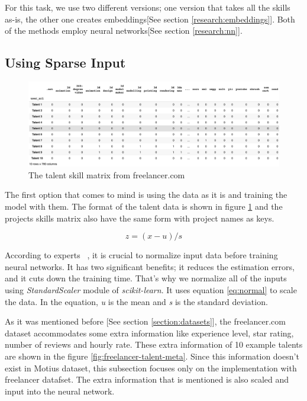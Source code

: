 For this task, we use two different versions; one version that takes all the skills as-is, the other one creates embeddings[See section \ref{research:embeddings}]. Both of the methods employ neural networks[See section \ref{research:nn}].


\subsection{Using Sparse Input}

\begin{figure}[htp]
	\centering
	\includegraphics[width=\textwidth]{figures/FreelancerTalentSkillsMatrix.png}
	\caption{The talent skill matrix from freelancer.com}
	\label{fig:freelancer-talent-matrix}
\end{figure}

The first option that comes to mind is using the data as it is and training the model with them. The format of the talent data is shown in figure \ref{fig:freelancer-talent-matrix} and the projects skills matrix also have the same form with project names as keys.


\begin{equation}
z = (x - u) / s
\label{eq:normal}
\end{equation}

According to experts ~\parencite{sola1997importance}, it is crucial to normalize input data before training neural networks. It has two significant benefits; it reduces the estimation errors, and it cuts down the training time. That's why we normalize all of the inputs using \textit{StandardScaler} module of \textit{scikit-learn}. It uses equation \ref{eq:normal} to scale the data. In the equation, \textit{u} is the mean and \textit{s} is the standard deviation.


As it was mentioned before [See section \ref{section:datasets}], the freelancer.com dataset accommodates some extra information like experience level, star rating, number of reviews and hourly rate. These extra information of 10 example talents are shown in the figure \ref{fig:freelancer-talent-meta}. Since this information doesn't exist in Motius dataset, this subsection focuses only on the implementation with freelancer datafset. The extra information that is mentioned is also scaled and input into the neural network. 


